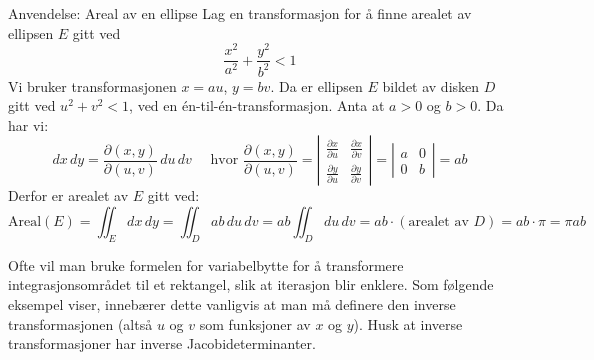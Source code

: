 \begin{eks}{Anvendelse: Areal av en ellipse}\label{eks:ellipse-areal}
Lag en transformasjon for å finne arealet av ellipsen \( E \) gitt ved
\[
\frac{x^2}{a^2} + \frac{y^2}{b^2} < 1
\]
Vi bruker transformasjonen \( x = au \), \( y = bv \). Da er ellipsen \( E \) bildet av disken \( D \) gitt ved \( u^2 + v^2 < 1 \), ved en én-til-én-transformasjon. Anta at \( a > 0 \) og \( b > 0 \). Da har vi:
\[
dx\,dy = \frac{\partial(x,y)}{\partial(u,v)} \, du\,dv
\quad \text{ hvor } \frac{\partial(x,y)}{\partial(u,v)} =
\left|
\begin{array}{cc}
\frac{\partial x}{\partial u} & \frac{\partial x}{\partial v} \\
\frac{\partial y}{\partial u} & \frac{\partial y}{\partial v}
\end{array}
\right|
=
\left|
\begin{array}{cc}
a & 0 \\
0 & b
\end{array}
\right|
= ab
\]
Derfor er arealet av \( E \) gitt ved:
\[
\text{Areal}(E) = \iint_E dx\,dy = \iint_D ab\,du\,dv = ab \iint_D du\,dv = ab \cdot (\text{arealet av } D) = ab \cdot \pi = \pi ab
\]
\end{eks}
Ofte vil man bruke formelen for variabelbytte for å transformere integrasjonsområdet til et rektangel, slik at iterasjon blir enklere. Som følgende eksempel viser, innebærer dette vanligvis at man må definere den inverse transformasjonen (altså \( u \) og \( v \) som funksjoner av \( x \) og \( y \)). Husk at inverse transformasjoner har inverse Jacobideterminanter.

